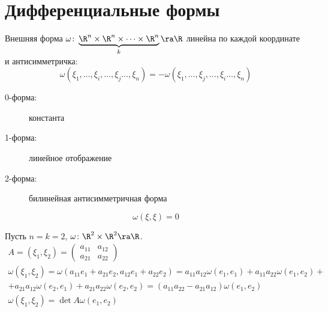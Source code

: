 \section{Дифференциальные формы}

\begin{Def}
	Внешняя форма $\omega\colon \underbrace{\R^n \times \R^n \times \dots \times \R^n}_{k} \ra \R$
	линейна по каждой координате и антисимметричка:
	\[ \omega(\xi_1, \dots, \xi_i, \dots, \xi_j \dots, \xi_n) = -\omega(\xi_1, \dots, \xi_j, \dots, \xi_i \dots, \xi_n) \]
\end{Def}

\begin{exmp}\begin{description}
	\item[0-форма:] константа
	\item[1-форма:] линейное отображение
	\item[2-форма:] билинейная антисимметричная форма
\end{description}\end{exmp}

\begin{Rem}
	\[ \omega(\xi, \xi) = 0 \]
\end{Rem}

Пусть $n=k=2$, $\omega\colon \R^2 \times \R^2 \ra \R$.
\begin{gather*}
	A = (\xi_1, \xi_2) = \begin{pmatrix} a_{11} & a_{12} \\ a_{21} & a_{22} \end{pmatrix} \\
	\omega(\xi_1, \xi_2)
	= \omega(a_{11} e_1 + a_{21} e_2, a_{12} e_1 + a_{22} e_2)
	= a_{11} a_{12} \omega(e_1, e_1)
	+ a_{11} a_{22} \omega(e_1, e_2) + \\
	+ a_{21} a_{12} \omega(e_2, e_1)
	+ a_{21} a_{22} \omega(e_2, e_2)
	= (a_{11} a_{22} - a_{21} a_{12}) \omega(e_1, e_2) \\
	\omega(\xi_1, \xi_2) = \det A \omega(e_1, e_2)
\end{gather*}

